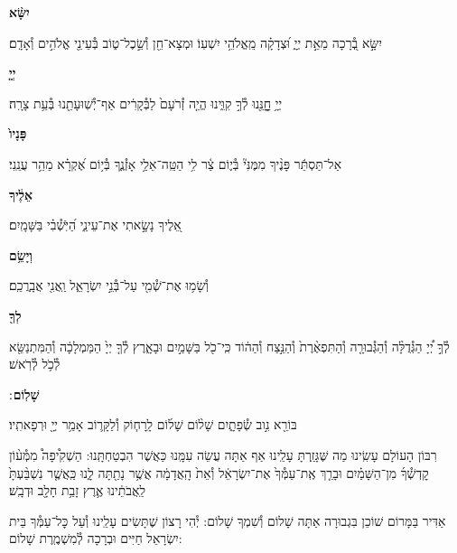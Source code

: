 \documentclass[twoside, openany, parskip=half, 11pt]{book}
\begin{document}
\textbf{יִשָּׂ֨א}
\hfill \begin{footnotesize}
יִשָּׂ֣א בְ֭֯רָכָה מֵאֵ֣ת יְיָ֑ וּ֝צְדָקָ֗ה מֵֽאֱלֹהֵ֥י יִשְׁעֽוֹ׃ וּמְצָא־חֵ֖ן וְ֯שֵׂ֣כֶל־ט֑וֹב בְּ֯עֵינֵ֖י אֱלֹהִ֣ים וְ֯אָדָֽם׃\\
\end{footnotesize}
\textbf{יְיָ֤}
\hfill \begin{footnotesize}
יְיָ֥ חׇׇׇׇנֵּ֖נוּ לְ֯ךָ֣ קִוִּ֑ינוּ הֱיֵ֤ה זְ֯רֹעָם֙ לַבְּ֯קָרִ֔ים אַף־יְ֯שֽׁוּעָתֵ֖נוּ בְּ֯עֵ֥ת צָרָֽה׃\\
\end{footnotesize}
\textbf{פָּנָיו֙}
\hfill \begin{footnotesize}
אַל־תַּסְתֵּ֬ר פָּנֶ֨יךָ מִמֶּנִּי֘ בְּ֯י֢וֹם צַ֫ר לִ֥י הַטֵּֽה־אֵלַ֥י אָזְ֯נֶ֑ךָ
בְּ֯י֥וֹם אֶ֝קְרָ֗א מַהֵ֥ר עֲנֵֽנִי׃\\
\end{footnotesize}
\textbf{אֵלֶ֔יךָ}
\hfill \begin{footnotesize}
אֵ֭לֶיךָ נָשָׂ֣אתִי אֶת־עֵינַ֑י הַ֝יֹּֽשְׁ֯בִ֗י בַּשָּׁמָֽיִם׃\\
\end{footnotesize}
\textbf{וְיָשֵׂ֥ם}
\hfill \begin{footnotesize}
וְ֯שָׂמ֥וּ אֶת־שְׁ֯מִ֖י עַל־בְּ֯נֵ֣י יִשְׂרָאֵ֑ל וַֽאֲנִ֖י אֲבָֽרֲכֵֽם׃\\
\end{footnotesize}
\textbf{לְךָ֖}
\hfill \begin{footnotesize}
לְ֯ךָ֣ יְ֠יָ הַגְּ֯דֻלָּ֨ה וְ֯הַגְּ֯בוּרָ֤ה וְ֯הַתִּפְאֶ֨רֶת֙ וְ֯הַנֵּ֣צַח וְ֯הַה֔וֹד
כִּֽי־כֹ֖ל בַּשָּׁמַ֣יִם וּבָאָ֑רֶץ לְ֯ךָ֤ יְיָ֙ הַמַּמְלָכָ֔ה וְ֯הַמִּתְנַשֵּׂ֖א
לְ֯כֹ֥ל לְ֯רֹֽאשׁ׃\\
\end{footnotesize}
\textbf{שָׁלֽוֹם}
׃ \hfill \begin{footnotesize}
בּוֹרֵ֖א נִ֣וב שְׂ֯פָתָ֑יִם שָׁל֨וֹם שָׁל֜וֹם לָֽרָח֧וֹק וְ֯לַקָּר֛וֹב
אָמַ֥ר יְיָ֖ וּרְפָאתִֽיו׃
\end{footnotesize}

\clearpage

\begin{paracol}{2}
רִבּוֹן הָעוֹלָם עָשִֽׂינוּ מַה שֶּׁגָּזַֽרְתָּ עָלֵֽינוּ אַף אַתָּה עֲשֵׂה עִמָּֽנוּ כַּאֲשֶׁר הִבְטַחְתָּֽנוּ: הַשְׁקִ֩יפָה֩ מִמְּ֯ע֨וֹן קׇדְשְׁ֯ךָ֜ מִן־הַשָּׁמַ֗יִם וּבָרֵ֤ךְ אֶֽת־עַמְּ֯ךָ֙ אֶת־יִשְׂרָאֵ֔ל וְ֯אֵת֙ הָֽאֲדָמָ֔ה אֲשֶׁ֥ר נָתַ֖תָּה לָ֑נוּ כַּֽאֲשֶׁ֤ר נִשְׁבַּ֨עְתָּ֙ לַֽאֲבֹתֵ֔ינוּ אֶ֛רֶץ זָבַ֥ת חָלָ֖ב וּדְבָֽשׁ׃

\switchcolumn

\kahal
אַדִּיר בַּמָּרוֹם שׁוֹכֵן בִּגְבוּרָה אַתָּה שָׁלוֹם וְ֯שִׁמְךָ שָׁלוֹם: יְ֯הִי רָצוֹן שֶׁתָּשִׂים עָלֵֽינוּ וְ֯עַל כׇּל־עַמְּ֯ךָ בֵּית יִשְׂרָאֵל חַיִּים וּבְרָכָה לְ֯מִשְׁמֶֽרֶת שָׁלוֹם:
\end{paracol}
\end{document}
